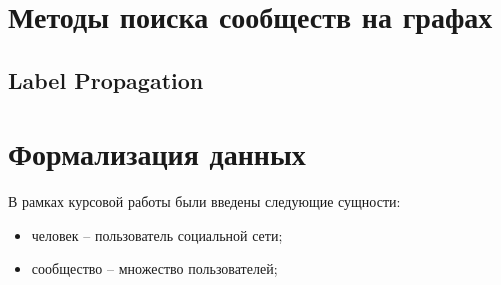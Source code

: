 \section{Методы поиска сообществ на графах}

\subsection{Label Propagation}



\section{Формализация данных}

В рамках курсовой работы были введены следующие сущности:

\begin{itemize}
	\item человек -- пользователь социальной сети;
	\item сообщество -- множество пользователей;
\end{itemize}

